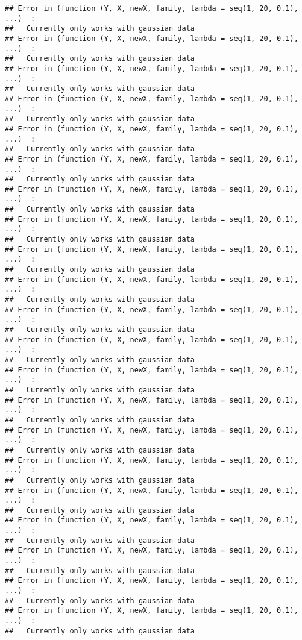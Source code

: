 \documentclass[
]{article}
\begin{document}
\begin{verbatim}
## Error in (function (Y, X, newX, family, lambda = seq(1, 20, 0.1), ...)  : 
##   Currently only works with gaussian data
## Error in (function (Y, X, newX, family, lambda = seq(1, 20, 0.1), ...)  : 
##   Currently only works with gaussian data
## Error in (function (Y, X, newX, family, lambda = seq(1, 20, 0.1), ...)  : 
##   Currently only works with gaussian data
## Error in (function (Y, X, newX, family, lambda = seq(1, 20, 0.1), ...)  : 
##   Currently only works with gaussian data
## Error in (function (Y, X, newX, family, lambda = seq(1, 20, 0.1), ...)  : 
##   Currently only works with gaussian data
## Error in (function (Y, X, newX, family, lambda = seq(1, 20, 0.1), ...)  : 
##   Currently only works with gaussian data
## Error in (function (Y, X, newX, family, lambda = seq(1, 20, 0.1), ...)  : 
##   Currently only works with gaussian data
## Error in (function (Y, X, newX, family, lambda = seq(1, 20, 0.1), ...)  : 
##   Currently only works with gaussian data
## Error in (function (Y, X, newX, family, lambda = seq(1, 20, 0.1), ...)  : 
##   Currently only works with gaussian data
## Error in (function (Y, X, newX, family, lambda = seq(1, 20, 0.1), ...)  : 
##   Currently only works with gaussian data
## Error in (function (Y, X, newX, family, lambda = seq(1, 20, 0.1), ...)  : 
##   Currently only works with gaussian data
## Error in (function (Y, X, newX, family, lambda = seq(1, 20, 0.1), ...)  : 
##   Currently only works with gaussian data
## Error in (function (Y, X, newX, family, lambda = seq(1, 20, 0.1), ...)  : 
##   Currently only works with gaussian data
## Error in (function (Y, X, newX, family, lambda = seq(1, 20, 0.1), ...)  : 
##   Currently only works with gaussian data
## Error in (function (Y, X, newX, family, lambda = seq(1, 20, 0.1), ...)  : 
##   Currently only works with gaussian data
## Error in (function (Y, X, newX, family, lambda = seq(1, 20, 0.1), ...)  : 
##   Currently only works with gaussian data
## Error in (function (Y, X, newX, family, lambda = seq(1, 20, 0.1), ...)  : 
##   Currently only works with gaussian data
## Error in (function (Y, X, newX, family, lambda = seq(1, 20, 0.1), ...)  : 
##   Currently only works with gaussian data
## Error in (function (Y, X, newX, family, lambda = seq(1, 20, 0.1), ...)  : 
##   Currently only works with gaussian data
## Error in (function (Y, X, newX, family, lambda = seq(1, 20, 0.1), ...)  : 
##   Currently only works with gaussian data
## Error in (function (Y, X, newX, family, lambda = seq(1, 20, 0.1), ...)  : 
##   Currently only works with gaussian data

\end{verbatim}
\end{document}
